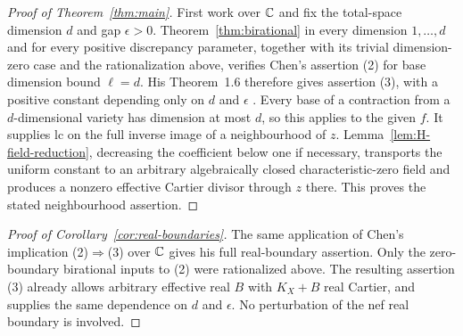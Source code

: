 \begin{proof}[Proof of Theorem~\ref{thm:main}]
First work over $\mathbb C$ and fix the total-space dimension $d$ and gap
$\epsilon>0$.  Theorem~\ref{thm:birational} in every dimension
$1,\ldots,d$ and for every positive discrepancy parameter, together
with its trivial dimension-zero case and the
rationalization above, verifies Chen's assertion (2) for base dimension
bound $\ell=d$.  His Theorem~1.6 therefore gives assertion (3), with a
positive constant depending only on $d$ and $\epsilon$
\cite{Chen2025}.  Every base of a contraction from a $d$-dimensional
variety has dimension at most $d$, so this applies to the given $f$.
It supplies lc on the full inverse image of a neighbourhood of $z$.
Lemma~\ref{lem:H-field-reduction}, decreasing the coefficient below one
if necessary, transports the uniform constant to an arbitrary
algebraically closed characteristic-zero field and produces a nonzero
effective Cartier divisor through $z$ there.  This proves the stated
neighbourhood assertion.
\end{proof}

\begin{proof}[Proof of Corollary~\ref{cor:real-boundaries}]
The same application of Chen's implication (2)$\Rightarrow$(3) over
$\mathbb C$ gives his full real-boundary assertion.  Only the zero-boundary
birational inputs to (2) were rationalized above.  The resulting
assertion (3) already allows arbitrary effective real $B$ with
$K_X+B$ real Cartier, and supplies the same dependence on $d$ and
$\epsilon$.  No perturbation of the nef real boundary is involved.
\end{proof}
